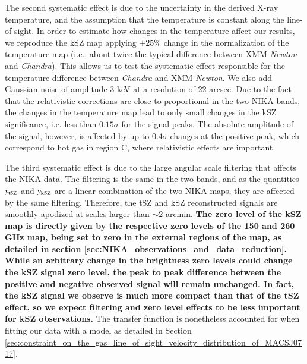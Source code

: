 \documentclass[twocolumn,traditabstract]{aa}
\begin{document}
The second systematic effect is due to the uncertainty in the derived X-ray temperature, and the assumption that the temperature is constant along the line-of-sight. In order to estimate how changes in the temperature affect our results, we reproduce the kSZ map applying $\pm 25$\% change in the normalization of the temperature map (i.e., about twice the typical difference between XMM-\textit{Newton} and \textit{Chandra}). This allows us to test the systematic effect responsible for the temperature difference between \textit{Chandra} and XMM-\textit{Newton}. We also add Gaussian noise of amplitude 3 keV at a resolution of 22 arcsec. Due to the fact that the relativistic corrections are close to proportional in the two NIKA bands, the changes in the temperature map lead to only small changes in the kSZ significance, i.e. less than $0.15 \sigma$ for the signal peaks. The absolute amplitude of the signal, however, is affected by up to $0.4 \sigma$ changes at the positive peak, which correspond to hot gas in region C, where relativistic effects are important.

The third systematic effect is due to the large angular scale filtering that affects the NIKA data. The filtering is the same in the two bands, and as the quantities $y_{\rm tSZ}$ and $y_{\rm kSZ}$ are a linear combination of the two NIKA maps, they are affected by the same filtering. Therefore, the tSZ and kSZ reconstructed signals are smoothly apodized at scales larger than $\sim 2$ arcmin. {\bf The zero level of the kSZ map is directly given by the respective zero levels of the 150 and 260 GHz map, being set to zero in the external regions of the map, as detailed in section \ref{sec:NIKA_observations_and_data_reduction}. While an arbitrary change in the brightness zero levels could change the kSZ signal zero level, the peak to peak difference between the positive and negative observed signal will remain unchanged. In fact, the kSZ signal we observe is much more compact than that of the tSZ effect, so we expect filtering and zero level effects to be less important for kSZ observations.} The transfer function is nonetheless accounted for when fitting our data with a model as detailed in Section \ref{sec:constraint_on_the_gas_line_of_sight_velocity_distribution_of_MACSJ0717}.

\end{document}
